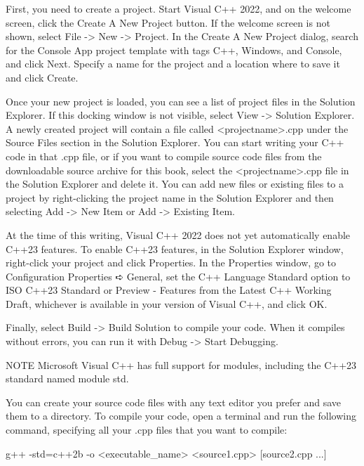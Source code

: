 First, you need to create a project. Start Visual C++ 2022, and on the welcome screen, click the Create A New Project button. If the welcome screen is not shown, select File -> New -> Project. In the Create A New Project dialog, search for the Console App project template with tags C++, Windows, and Console, and click Next. Specify a name for the project and a location where to save it and click Create.

Once your new project is loaded, you can see a list of project files in the Solution Explorer. If this docking window is not visible, select View -> Solution Explorer. A newly created project will contain a file called <projectname>.cpp under the Source Files section in the Solution Explorer. You can start writing your C++ code in that .cpp file, or if you want to compile source code files from the downloadable source archive for this book, select the <projectname>.cpp file in the Solution Explorer and delete it. You can add new files or existing files to a project by right-clicking the project name in the Solution Explorer and then selecting Add -> New Item or Add -> Existing Item.

At the time of this writing, Visual C++ 2022 does not yet automatically enable C++23 features. To enable C++23 features, in the Solution Explorer window, right-click your project and click Properties. In the Properties window, go to Configuration Properties ➪ General, set the C++ Language Standard option to ISO C++23 Standard or Preview - Features from the Latest C++ Working Draft, whichever is available in your version of Visual C++, and click OK.

Finally, select Build -> Build Solution to compile your code. When it compiles without errors, you can run it with Debug -> Start Debugging.

\begin{myNotic}{NOTE}
Microsoft Visual C++ has full support for modules, including the C++23 standard named module std.
\end{myNotic}


You can create your source code files with any text editor you prefer and save them to a directory. To compile your code, open a terminal and run the following command, specifying all your .cpp files that you want to compile:

\begin{shell}
g++ -std=c++2b -o <executable_name> <source1.cpp> [source2.cpp ...]
\end{shell}

